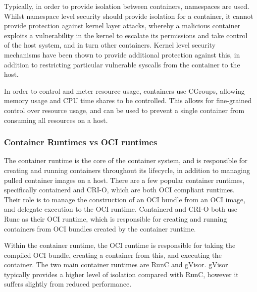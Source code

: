 Typically, in order to provide isolation between containers, namespaces are used\cite{NamespacesLinuxManual}. Whilst namespace level security should provide isolation for a container, it cannot provide protection against kernel layer attacks, whereby a malicious container exploits a vulnerability in the kernel to escalate its permissions and take control of the host system, and in turn other containers\cite{linMeasurementStudyLinux2018}. Kernel level security mechanisms have been shown to provide additional protection against this\cite{sunSecurityNamespaceMaking2018}, in addition to restricting particular vulnerable syscalls from the container to the host\cite{GVisor}.

In order to control and meter resource usage, containers use CGroups, allowing memory usage and CPU time shares to be controlled\cite{CgroupsLinuxManual}. This allows for fine-grained control over resource usage, and can be used to prevent a single container from consuming all resources on a host\cite{ContainerSecurityFundamentals}.

\subsubsection{Container Runtimes vs OCI runtimes}
The container runtime is the core of the container system, and is responsible for creating and running containers throughout its lifecycle, in addition to managing pulled container images on a host\cite{espePerformanceEvaluationContainer2020}. There are a few popular container runtimes, specifically containerd and CRI-O, which are both OCI compliant runtimes. Their role is to manage the construction of an OCI bundle from an OCI image, and delegate execution to the OCI runtime. Containerd and CRI-O both use Runc as their OCI runtime, which is responsible for creating and running containers from OCI bundles created by the container runtime.

Within the container runtime, the OCI runtime is responsible for taking the compiled OCI bundle, creating a container from this, and executing the container. The two main container runtimes are RunC\cite{OpencontainersRunc2024} and gVisor\cite{GVisor}. gVisor typically provides a higher level of isolation compared with RunC, however it suffers slightly from reduced performance\cite{espePerformanceEvaluationContainer2020}.

